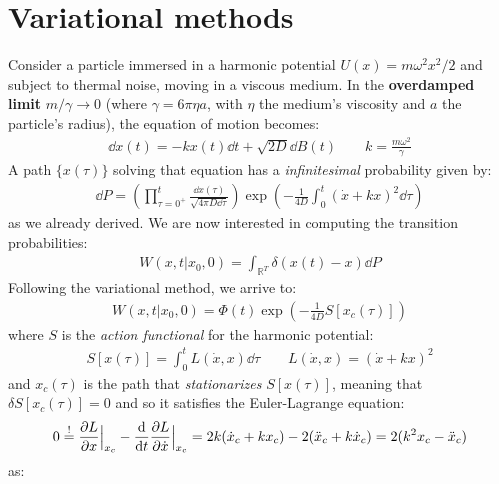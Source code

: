 \documentclass[../template.tex]{subfiles}
\begin{document}
\section{Variational methods}
\begin{example}
    Consider a particle immersed in a harmonic potential $U(x) = m \omega^2 x^2/2$ and subject to thermal noise, moving in a viscous medium. In the \textbf{overdamped limit} $m/\gamma \to 0$ (where $\gamma = 6 \pi \eta a$, with $\eta$ the medium's viscosity and $a$ the particle's radius), the equation of motion becomes:
    \begin{align*}
        \dd{x(t)} = -kx(t) \dd{t} + \sqrt{2D} \dd{B(t)} \qquad k= \frac{m \omega^2}{\gamma} 
    \end{align*}
    A path $\{x(\tau)\}$ solving that equation has a \textit{infinitesimal} probability given by: 
    \begin{align*}
        \dd{P} = \left( \prod_{\tau = 0^+}^t \frac{\dd{x(\tau)}}{\sqrt{4 \pi D \dd{\tau}}} \right) \exp\left(-\frac{1}{4D} \int_0^t (\dot{x} + kx)^2 \dd{\tau} \right)
    \end{align*} 
    as we already derived. We are now interested in computing the transition probabilities:
    \begin{align*}
        W(x,t|x_0,0) = \int_{\mathbb{R}^T} \delta(x(t) - x) \dd{P} 
    \end{align*}
    Following the variational method, we arrive to:
    \begin{align}\label{eqn:harmonic-variational}
        W(x,t|x_0,0) = \Phi(t) \exp\left(-\frac{1}{4D} S[x_c(\tau)] \right)
    \end{align}
    where $S$ is the \textit{action functional} for the harmonic potential:
    \begin{align*}
        S[x(\tau)] = \int_0^t L(\dot{x}, x) \dd{\tau} \qquad L(\dot{x},x) = (\dot{x} + kx)^2
    \end{align*}
    and $x_c(\tau)$ is the path that \textit{stationarizes} $S[x(\tau)]$, meaning that $\delta S[x_c(\tau)] = 0$ and so it satisfies the Euler-Lagrange equation:
    \begin{align*}
        0 \overset{!}{=}  \pdv{L}{x} \Big|_{x_c} - \dv{t} \pdv{L}{\dot{x}} \Big|_{x_c} = 2k(\dot{x}_c + kx_c) - 2(\ddot{x}_c + k\dot{x}_c) = 2(k^2 x_c - \ddot{x}_c)
    \end{align*}   
    as:
    \begin{align*}

\end{align*}
\end{example}
\end{document}
